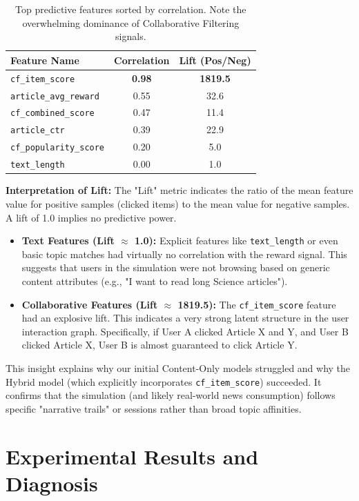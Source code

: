 \documentclass[11pt,a4paper]{article}
\begin{document}
\begin{table}[H]
\centering
\begin{tabular}{@{}lcc@{}}
\toprule
\textbf{Feature Name} & \textbf{Correlation} & \textbf{Lift (Pos/Neg)} \\ \midrule
\texttt{cf\_item\_score} & \textbf{0.98} & \textbf{1819.5} \\
\texttt{article\_avg\_reward} & 0.55 & 32.6 \\
\texttt{cf\_combined\_score} & 0.47 & 11.4 \\
\texttt{article\_ctr} & 0.39 & 22.9 \\
\texttt{cf\_popularity\_score} & 0.20 & 5.0 \\
\texttt{text\_length} & 0.00 & 1.0 \\
\bottomrule
\end{tabular}
\caption{Top predictive features sorted by correlation. Note the overwhelming dominance of Collaborative Filtering signals.}
\label{tab:feature_importance}
\end{table}

\textbf{Interpretation of Lift:}
The "Lift" metric indicates the ratio of the mean feature value for positive samples (clicked items) to the mean value for negative samples. A lift of 1.0 implies no predictive power.
\begin{itemize}
    \item \textbf{Text Features (Lift $\approx$ 1.0):} Explicit features like \texttt{text\_length} or even basic topic matches had virtually no correlation with the reward signal. This suggests that users in the simulation were not browsing based on generic content attributes (e.g., "I want to read long Science articles").
    \item \textbf{Collaborative Features (Lift $\approx$ 1819.5):} The \texttt{cf\_item\_score} feature had an explosive lift. This indicates a very strong latent structure in the user interaction graph. Specifically, if User A clicked Article X and Y, and User B clicked Article X, User B is almost guaranteed to click Article Y.
\end{itemize}

This insight explains why our initial Content-Only models struggled and why the Hybrid model (which explicitly incorporates \texttt{cf\_item\_score}) succeeded. It confirms that the simulation (and likely real-world news consumption) follows specific "narrative trails" or sessions rather than broad topic affinities.

\section{Experimental Results and Diagnosis}
\end{document}
